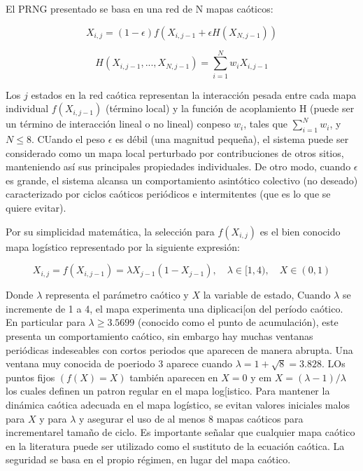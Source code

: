 \documentclass[10pt]{IEEEtran}
\begin{document}
El PRNG presentado se basa en una red de N mapas caóticos:

\begin{equation}
X_{i,j}= (1- \epsilon)f(X_{i,j-1}+ \epsilon H(X_{N, j-1}))
\end{equation}



\begin{equation}
H(X_{i,j-1}, ... ,X_{N, j-1})= \sum_{i=1}^{N}w_{i}X_{i,j-1}
\end{equation}

Los $j$ estados en la red caótica representan la interacción pesada entre cada mapa individual $f(X_{i,j-1})$ (término local) y la función de acoplamiento H (puede ser un término de interacción lineal o no lineal) conpeso $w_{i}$, tales que $\sum_{i=1}^{N}w_{i}$, y $N \leq 8$. CUando el peso $\epsilon$ es débil (una magnitud pequeña), el sistema puede ser considerado como un mapa local perturbado por contribuciones de otros sitios, manteniendo así sus principales propiedades individuales. De otro modo, cuando $\epsilon$ es grande, el sistema alcansa un comportamiento asintótico colectivo (no deseado) caracterizado por ciclos caóticos periódicos e intermitentes (que es lo que se quiere evitar).

Por su simplicidad matemática, la selección para $f(X_{i,j})$ es el bien conocido mapa logístico representado por la siguiente expresión:


\begin{equation}
X_{i,j}= f(X_{i,j-1})= \lambda X_{j-1}(1- X_{j-1}), \quad \lambda \in [1,4), \quad X \in (0,1)
\end{equation}

Donde $\lambda$ representa el parámetro caótico y $X$ la variable de estado, Cuando $\lambda$ se incremente de 1 a 4, el mapa experimenta una diplicaci[on del período caótico. En particular para $\lambda \geq 3.5699 $ (conocido como el punto de acumulación), este presenta un comportamiento caótico, sin embargo hay muchas ventanas periódicas indeseables con cortos periodos que aparecen de manera abrupta. Una ventana muy conocida de poeriodo 3 aparece cuando $\lambda = 1+ \sqrt{8}= 3.828$. LOs puntos fijos $(f(X)=X)$ también aparecen en $X=0$ y em $X= (\lambda -1)/ \lambda$ los cuales definen un patron regular en el mapa log[istico. Para mantener la dinámica caótica adecuada en el mapa logístico, se evitan valores iniciales malos para $X$ y para $\lambda$ y asegurar el uso de al menos 8 mapas caóticos para incrementarel tamaño de ciclo. Es importante señalar que cualquier mapa caótico en la literatura puede ser utilizado como el sustituto de la ecuación caótica. La seguridad se basa en el propio régimen, en lugar del mapa caótico.
\end{document}
